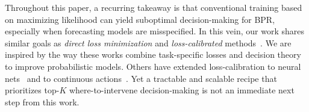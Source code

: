Throughout this paper, a recurring takeaway is that conventional training based on maximizing likelihood can yield suboptimal decision-making for BPR, especially when forecasting models are misspecified. In this vein, our work shares similar goals as \emph{direct loss minimization} \citep{weiDirectLoss2021} and \emph{loss-calibrated} methods~\citep{lacoste-julienApproximateInferenceLosscalibrated2011}. We are inspired by the way these works combine task-specific losses and decision theory to improve probabilistic models. Others have extended loss-calibration to neural nets~\citep{cobbLossCalibratedApproximateInference2018a} and to continuous actions~\citep{kusmierczykVariationalBayesianDecisionmaking2019}. 
Yet a tractable and scalable recipe that prioritizes top-$K$ where-to-intervene decision-making is not an immediate next step from this work.







